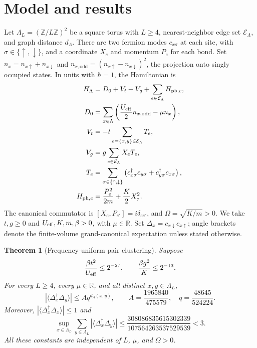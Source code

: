 \documentclass[11pt]{article}
\newtheorem{theorem}{Theorem}
\newcommand{\Deltaop}{\Delta}
\begin{document}
\section{Model and results}

Let $\Lambda_L=(\mathbb{Z}/L\mathbb{Z})^2$ be a square torus with $L\ge4$, nearest-neighbor edge set $\mathcal{E}_\Lambda$, and graph distance $d_\Lambda$. There are two fermion modes $c_{x\sigma}$ at each site, with $\sigma\in\{\uparrow,\downarrow\}$, and a coordinate $X_e$ and momentum $P_e$ for each bond. Set $n_x=n_{x\uparrow}+n_{x\downarrow}$ and $n_{x,\mathrm{odd}}=(n_{x\uparrow}-n_{x\downarrow})^2$, the projection onto singly occupied states. In units with $\hbar=1$, the Hamiltonian is
\begin{align}
H_\Lambda&=D_0+V_t+V_g+\sum_{e\in\mathcal{E}_\Lambda}H_{\mathrm{ph},e},\notag\\
D_0&=\sum_{x\in\Lambda}\left(\frac{U_{\rm eff}}2 n_{x,\mathrm{odd}}-\mu n_x\right),\notag\\
V_t&=-t\sum_{e=\{x,y\}\in\mathcal{E}_\Lambda}T_e,\notag\\
V_g&=g\sum_{e\in\mathcal{E}_\Lambda}X_eT_e,\notag\\
T_e&=\sum_{\sigma\in\{\uparrow,\downarrow\}}
\left(c_{x\sigma}^\dagger c_{y\sigma}+c_{y\sigma}^\dagger c_{x\sigma}\right),\notag\\
H_{\mathrm{ph},e}&=\frac{P_e^2}{2m}+\frac K2 X_e^2.
\end{align}
The canonical commutator is $[X_e,P_{e'}]=i\delta_{ee'}$, and $\Omega=\sqrt{K/m}>0$. We take $t,g\ge0$ and $U_{\rm eff},K,m,\beta>0$, with $\mu\in\mathbb{R}$. Set $\Deltaop_x=c_{x\downarrow}c_{x\uparrow}$; angle brackets denote the finite-volume grand-canonical expectation unless stated otherwise.

\begin{theorem}[Frequency-uniform pair clustering]
Suppose
\[
\frac{\beta t^2}{U_{\rm eff}}\le2^{-27},\qquad
\frac{\beta g^2}{K}\le2^{-13}.
\]
For every $L\ge4$, every $\mu\in\mathbb{R}$, and all distinct $x,y\in\Lambda_L$,
\[
\left|\langle\Deltaop_x^\dagger\Deltaop_y\rangle\right|
\le A q^{d_\Lambda(x,y)},\qquad
A=\frac{1965840}{475579},\quad q=\frac{48645}{524224}.
\]
Moreover, $|\langle\Deltaop_x^\dagger\Deltaop_x\rangle|\le1$ and
\[
\sup_{x\in\Lambda_L}\sum_{y\in\Lambda_L}
\left|\langle\Deltaop_x^\dagger\Deltaop_y\rangle\right|
\le \frac{308086835615302339}{107564263537529539}<3.
\]
All these constants are independent of $L$, $\mu$, and $\Omega>0$.
\end{theorem}
\end{document}
